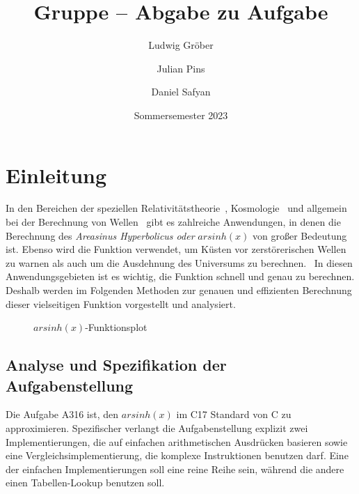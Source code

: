 \documentclass[course=erap] {aspdoc}
\author{Ludwig Gröber \and Julian Pins \and Daniel Safyan}
\date{Sommersemester 2023} %
\title{Gruppe \theGroup{} -- Abgabe zu Aufgabe \theNumber}
\begin{document}
    \maketitle


    \section{Einleitung}\label{sec:einleitung}

    In den Bereichen der speziellen Relativitätstheorie~\cite{relativity}, Kosmologie~\cite{universum1,universum2} und allgemein bei der Berechnung von Wellen~\cite{linear_waves} gibt es zahlreiche Anwendungen, in denen die Berechnung des \textit{Areasinus Hyperbolicus oder} $arsinh(x)$ von großer Bedeutung ist.
    Ebenso wird die Funktion verwendet, um Küsten vor zerstörerischen Wellen zu warnen als auch um die Ausdehnung des Universums zu berechnen.~\cite{universum1,universum2}
    In diesen Anwendungsgebieten ist es wichtig, die Funktion schnell und genau zu berechnen.
    Deshalb werden im Folgenden Methoden zur genauen und effizienten Berechnung dieser vielseitigen Funktion vorgestellt und analysiert.
    \begin{figure}[h]
    \caption{$arsinh(x)$-Funktionsplot}
    \end{figure}

    \subsection{Analyse und Spezifikation der Aufgabenstellung}\label{subsec:analyse-und-spezifikation-der-aufgabenstellung}

    Die Aufgabe A316 ist, den $arsinh(x)$ im C17 Standard von C zu approximieren.
    Spezifischer verlangt die Aufgabenstellung explizit zwei Implementierungen, die auf einfachen arithmetischen Ausdrücken basieren sowie eine Vergleichsimplementierung, die komplexe Instruktionen benutzen darf.
    Eine der einfachen Implementierungen soll eine reine Reihe sein, während die andere einen Tabellen-Lookup benutzen soll.
\end{document}
